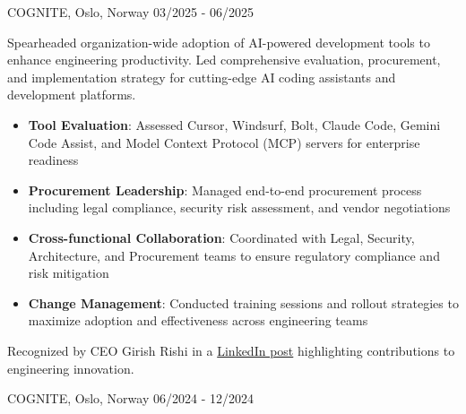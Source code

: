 \documentclass[singlesided,
               paper=a4,
               fontsize=10pt
              ]{my-resume}
\begin{document}
%
	{COGNITE, Oslo, Norway}
	{03/2025 - 06/2025}
    {
        Spearheaded organization-wide adoption of AI-powered development tools to enhance engineering productivity. Led comprehensive evaluation, procurement, and implementation strategy for cutting-edge AI coding assistants and development platforms.

        \begin{itemize}[leftmargin=2em]
            \item \textbf{Tool Evaluation}: Assessed Cursor, Windsurf, Bolt, Claude Code, Gemini Code Assist, and Model Context Protocol (MCP) servers for enterprise readiness
            \item \textbf{Procurement Leadership}: Managed end-to-end procurement process including legal compliance, security risk assessment, and vendor negotiations
            \item \textbf{Cross-functional Collaboration}: Coordinated with Legal, Security, Architecture, and Procurement teams to ensure regulatory compliance and risk mitigation
            \item \textbf{Change Management}: Conducted training sessions and rollout strategies to maximize adoption and effectiveness across engineering teams
        \end{itemize}

        Recognized by CEO Girish Rishi in a \href{https://www.linkedin.com/posts/girish-rishi-4392587_peet-cremer-our-engineering-leader-showing-activity-7343289548442955776-Zu2p?utm_source=share&utm_medium=member_desktop&rcm=ACoAADAmkPABVhPkjuk0vvCtiRSid_p7fC4zU_o}{LinkedIn post} highlighting contributions to engineering innovation.
    }
%
	{COGNITE, Oslo, Norway}
	{06/2024 - 12/2024}
\end{document}
